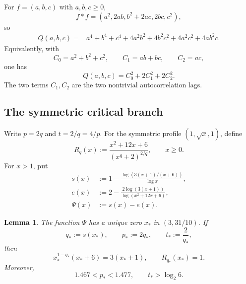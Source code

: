 \documentclass[11pt,reqno]{amsart}
\numberwithin{equation}{section}
\newtheorem{lemma}[lemma]{Lemma}
\theoremstyle{definition}
\theoremstyle{remark}
\begin{document}
For $f=(a,b,c)$ with $a,b,c\ge0$,
\[
  f*f=(a^2,2ab,b^2+2ac,2bc,c^2),
\]
so
\begin{equation}\label{eq:Q-ternary}
\begin{aligned}
  Q(a,b,c)
  ={}&a^4+b^4+c^4+4a^2b^2+4b^2c^2
      +4a^2c^2+4ab^2c.
\end{aligned}
\end{equation}
Equivalently, with
\[
  C_0=a^2+b^2+c^2,
  \qquad C_1=ab+bc,
  \qquad C_2=ac,
\]
one has
\begin{equation}\label{eq:ternary-autocorr}
  Q(a,b,c)=C_0^2+2C_1^2+2C_2^2.
\end{equation}
The two terms $C_1,C_2$ are the two nontrivial autocorrelation lags.

\subsection{The symmetric critical branch}

Write $p=2q$ and $t=2/q=4/p$.  For the symmetric profile
$(1,\sqrt x,1)$, define
\begin{equation}\label{eq:Rq}
  R_q(x):=\frac{x^2+12x+6}{(x^q+2)^{2/q}},
  \qquad x\ge0.
\end{equation}
For $x>1$, put
\begin{align}
  s(x)&:=1-\frac{\log(3(x+1)/(x+6))}{\log x},\label{eq:sx}\\
  e(x)&:=2-\frac{2\log(3(x+1))}{\log(x^2+12x+6)},\label{eq:ex}\\
  \Psi(x)&:=s(x)-e(x).\label{eq:Psi}
\end{align}

\begin{lemma}\label{lem:critical-pair}
The function $\Psi$ has a unique zero $x_*$ in $(3,31/10)$.  If
\begin{equation}\label{eq:pstar-def}
  q_*:=s(x_*),
  \qquad p_*:=2q_*,
  \qquad t_*:=\frac2{q_*},
\end{equation}
then
\begin{equation}\label{eq:critical-system}
  x_*^{1-q_*}(x_*+6)=3(x_*+1),
  \qquad R_{q_*}(x_*)=1.
\end{equation}
Moreover,
\begin{equation}\label{eq:coarse-pstar}
  1.467<p_*<1.477,
  \qquad t_*>\log_2 6.
\end{equation}
\end{lemma}
\end{document}
